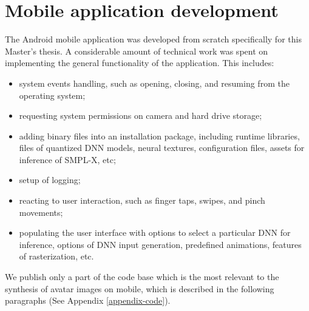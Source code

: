 \section{Mobile application development}
\label{methods:app}

The Android mobile application was developed from scratch specifically for this Master's thesis. A considerable amount of technical work was spent on implementing the general functionality of the application. This includes:
\begin{itemize}
	\item system events handling, such as opening, closing, and resuming from the operating system;
	\item requesting system permissions on camera and hard drive storage;
	\item adding binary files into an installation package, including runtime libraries, files of quantized DNN models, neural textures, configuration files, assets for inference of SMPL-X, etc;
	\item setup of logging;
	\item reacting to user interaction, such as finger taps, swipes, and pinch movements;
	\item populating the user interface with options to select a  particular DNN for inference, options of DNN input generation, predefined animations, features of rasterization, etc. 
\end{itemize}

We publish only a part of the code base which is the most relevant to the synthesis of avatar images on mobile, which is described in the following paragraphs (See Appendix \ref{appendix-code}).

